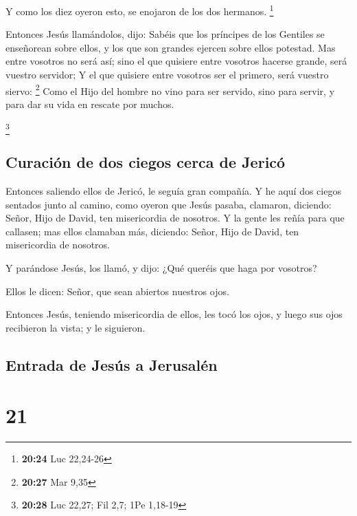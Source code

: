  Y como los diez oyeron esto, se enojaron de los dos
hermanos. \footnote{\textbf{20:24} Luc 22,24-26}

 Entonces Jesús llamándolos, dijo: Sabéis que los
príncipes de los Gentiles se enseñorean sobre ellos, y los que son
grandes ejercen sobre ellos potestad.  Mas entre vosotros
no será así; sino el que quisiere entre vosotros hacerse grande, será
vuestro servidor;  Y el que quisiere entre vosotros ser
el primero, será vuestro siervo: \footnote{\textbf{20:27} Mar 9,35}
 Como el Hijo del hombre no vino para ser servido, sino
para servir, y para dar su vida en rescate por muchos.

\footnote{\textbf{20:28} Luc 22,27; Fil 2,7; 1Pe 1,18-19}

\hypertarget{curaciuxf3n-de-dos-ciegos-cerca-de-jericuxf3}{%
\subsection{Curación de dos ciegos cerca de
Jericó}\label{curaciuxf3n-de-dos-ciegos-cerca-de-jericuxf3}}

 Entonces saliendo ellos de Jericó, le seguía gran
compañía.  Y he aquí dos ciegos sentados junto al camino,
como oyeron que Jesús pasaba, clamaron, diciendo: Señor, Hijo de David,
ten misericordia de nosotros.  Y la gente les reñía para
que callasen; mas ellos clamaban más, diciendo: Señor, Hijo de David,
ten misericordia de nosotros.

 Y parándose Jesús, los llamó, y dijo: ¿Qué queréis que
haga por vosotros?

 Ellos le dicen: Señor, que sean abiertos nuestros ojos.

 Entonces Jesús, teniendo misericordia de ellos, les tocó
los ojos, y luego sus ojos recibieron la vista; y le siguieron.

\hypertarget{entrada-de-jesuxfas-a-jerusaluxe9n}{%
\subsection{Entrada de Jesús a
Jerusalén}\label{entrada-de-jesuxfas-a-jerusaluxe9n}}

\hypertarget{section-20}{%
\section{21}\label{section-20}}

